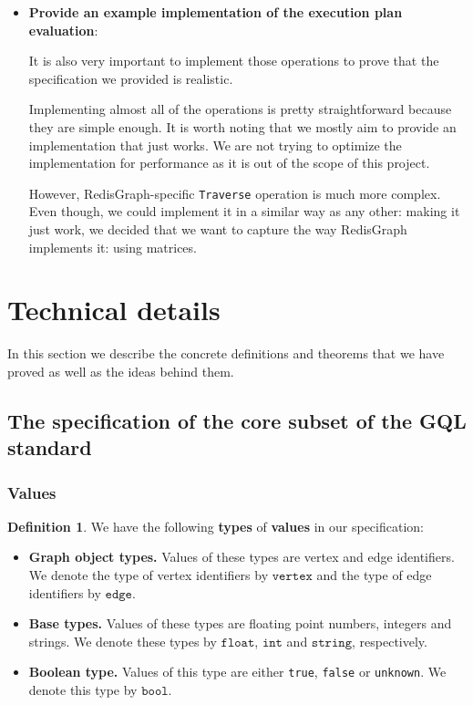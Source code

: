 \documentclass[14pt]{constructor-thesis}
\theoremstyle{definition}
\newtheorem*{definition}{Definition}
\begin{document}
\begin{itemize}
  \item \textbf{Provide an example implementation of the execution plan evaluation}:
  
  It is also very important to implement those operations to prove that the specification we provided is realistic.
  
  Implementing almost all of the operations is pretty straightforward because they are simple enough. It is worth noting that we mostly aim to provide an implementation that just works. We are not trying to optimize the implementation for performance as it is out of the scope of this project.

  However, RedisGraph-specific \texttt{Traverse} operation is much more complex. Even though, we could implement it in a similar way as any other: making it just work, we decided that we want to capture the way RedisGraph implements it: using matrices. 
  

\end{itemize}

\section{Technical details}

In this section we describe the concrete definitions and theorems that we have proved as well as the ideas behind them.

\subsection{The specification of the core subset of the GQL standard}

\subsubsection{Values}

\begin{definition}
  We have the following \textbf{types} of \textbf{values} in our specification:
  \begin{itemize}
    \item \textbf{Graph object types.} Values of these types are vertex and edge identifiers. We denote the type of vertex identifiers by $\mathtt{vertex}$ and the type of edge identifiers by $\mathtt{edge}$.
    \item \textbf{Base types.} Values of these types are floating point numbers, integers and strings. We denote these types by $\mathtt{float}$, $\mathtt{int}$ and $\mathtt{string}$, respectively.
    \item \textbf{Boolean type.} Values of this type are either \texttt{true}, \texttt{false} or \texttt{unknown}. We denote this type by $\mathtt{bool}$.
  \end{itemize}
\end{definition}
\end{document}
